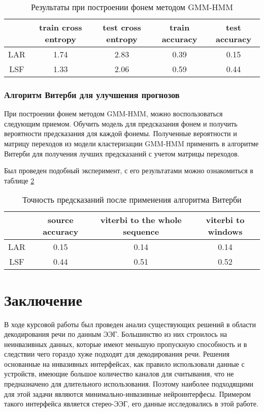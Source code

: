 \documentclass[a4paper,14pt]{extarticle}
\begin{document}
\begin{table}[!htbp]
	\caption{Результаты при построении фонем методом GMM-HMM}
	\label{table:gmmhmm_result}
	\centering
	\begin{tabular}{|| c | c | c | c | c ||}
		\hline
		 & train cross entropy & test cross entropy & train accuracy & test accuracy \\
		\hline\hline
		LAR & 1.74 & 2.83 & 0.39 & 0.15\\
		LSF & 1.33 & 2.06 & 0.59 & 0.44\\
		\hline
	\end{tabular}	
\end{table}


\newpage
\subsubsection{Алгоритм Витерби для улучшения прогнозов}

При построении фонем методом GMM-HMM, можно воспользоваться следующим приемом. Обучить модель для предсказания фонем и получить вероятности предсказания для каждой фонемы. Полученные вероятности и матрицу переходов из модели кластеризации GMM-HMM применить в алгоритме Витерби для получения лучших предсказаний с учетом матрицы переходов.

Был проведен подобный эксперимент, с его результатами можно ознакомиться в таблице \ref{table:viterbi_result}

\begin{table}[!htbp]
	\caption{Точность предсказаний после применения алгоритма Витерби}
	\label{table:viterbi_result}
	\centering
	\begin{tabular}{|| c | c | c | c ||}
		\hline
		 & source accuracy & viterbi to the whole sequence & viterbi to windows \\
		\hline\hline
		LAR & 0.15 & 0.14 & 0.14 \\
		LSF & 0.44 & 0.51 & 0.52 \\
		\hline
	\end{tabular}	
\end{table}

\section{Заключение}

В ходе курсовой работы был проведен анализ существующих решений в области декодирования речи по данным ЭЭГ. Большинство из них строилось на неинвазивных данных, которые имеют меньшую пропускную способность и в следствии чего гораздо хуже подходят для декодирования речи. Решения основанные на инвазивных интерфейсах,  как правило использовали данные с устройств, имеющие большое количество каналов для считывания, что не предназначено для длительного использования. Поэтому наиболее подходящими для этой задачи являются минимально-инвазивные нейроинтерфесы. Примером такого интерфейса является стерео-ЭЭГ, его данные исследовались в этой работе.
\end{document}
